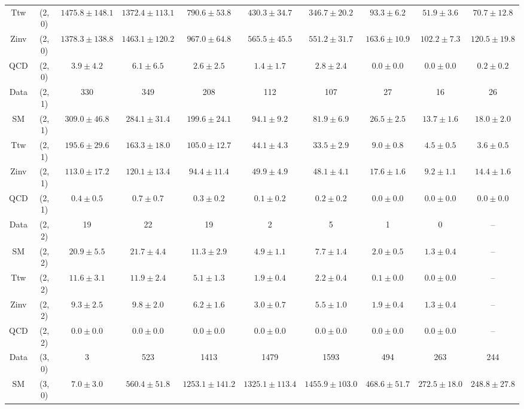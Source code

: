 \begin{table}[h!]
{\begin{tabular}{cccccccccc}
	Ttw & (2, 0) & $1475.8\pm 148.1$ & $1372.4\pm 113.1$ & $790.6\pm 53.8$ & $430.3\pm 34.7$ & $346.7\pm 20.2$ & $93.3\pm 6.2$ & $51.9\pm 3.6$ & $70.7\pm 12.8$ \\[0.5ex] 
	Zinv & (2, 0) & $1378.3\pm 138.8$ & $1463.1\pm 120.2$ & $967.0\pm 64.8$ & $565.5\pm 45.5$ & $551.2\pm 31.7$ & $163.6\pm 10.9$ & $102.2\pm 7.3$ & $120.5\pm 19.8$ \\[0.5ex] 
	QCD & (2, 0) & $3.9\pm 4.2$ & $6.1\pm 6.5$ & $2.6\pm 2.5$ & $1.4\pm 1.7$ & $2.8\pm 2.4$ & $0.0\pm 0.0$ & $0.0\pm 0.0$ & $0.2\pm 0.2$ \\[0.5ex] 
	Data & (2, 1) & 330 & 349 & 208 & 112 & 107 & 27 & 16 & 26 \\[0.5ex] 
	SM & (2, 1) & $309.0\pm 46.8$ & $284.1\pm 31.4$ & $199.6\pm 24.1$ & $94.1\pm 9.2$ & $81.9\pm 6.9$ & $26.5\pm 2.5$ & $13.7\pm 1.6$ & $18.0\pm 2.0$ \\[0.5ex] 
	Ttw & (2, 1) & $195.6\pm 29.6$ & $163.3\pm 18.0$ & $105.0\pm 12.7$ & $44.1\pm 4.3$ & $33.5\pm 2.9$ & $9.0\pm 0.8$ & $4.5\pm 0.5$ & $3.6\pm 0.5$ \\[0.5ex] 
	Zinv & (2, 1) & $113.0\pm 17.2$ & $120.1\pm 13.4$ & $94.4\pm 11.4$ & $49.9\pm 4.9$ & $48.1\pm 4.1$ & $17.6\pm 1.6$ & $9.2\pm 1.1$ & $14.4\pm 1.6$ \\[0.5ex] 
	QCD & (2, 1) & $0.4\pm 0.5$ & $0.7\pm 0.7$ & $0.3\pm 0.2$ & $0.1\pm 0.2$ & $0.2\pm 0.2$ & $0.0\pm 0.0$ & $0.0\pm 0.0$ & $0.0\pm 0.0$ \\[0.5ex] 
	Data & (2, 2) & 19 & 22 & 19 & 2 & 5 & 1 & 0 & -- \\[0.5ex] 
	SM & (2, 2) & $20.9\pm 5.5$ & $21.7\pm 4.4$ & $11.3\pm 2.9$ & $4.9\pm 1.1$ & $7.7\pm 1.4$ & $2.0\pm 0.5$ & $1.3\pm 0.4$ & -- \\[0.5ex] 
	Ttw & (2, 2) & $11.6\pm 3.1$ & $11.9\pm 2.4$ & $5.1\pm 1.3$ & $1.9\pm 0.4$ & $2.2\pm 0.4$ & $0.1\pm 0.0$ & $0.0\pm 0.0$ & -- \\[0.5ex] 
	Zinv & (2, 2) & $9.3\pm 2.5$ & $9.8\pm 2.0$ & $6.2\pm 1.6$ & $3.0\pm 0.7$ & $5.5\pm 1.0$ & $1.9\pm 0.4$ & $1.3\pm 0.4$ & -- \\[0.5ex] 
	QCD & (2, 2) & $0.0\pm 0.0$ & $0.0\pm 0.0$ & $0.0\pm 0.0$ & $0.0\pm 0.0$ & $0.0\pm 0.0$ & $0.0\pm 0.0$ & $0.0\pm 0.0$ & -- \\[0.5ex] 
	Data & (3, 0) & 3 & 523 & 1413 & 1479 & 1593 & 494 & 263 & 244 \\[0.5ex] 
	SM & (3, 0) & $7.0\pm 3.0$ & $560.4\pm 51.8$ & $1253.1\pm 141.2$ & $1325.1\pm 113.4$ & $1455.9\pm 103.0$ & $468.6\pm 51.7$ & $272.5\pm 18.0$ & $248.8\pm 27.8$ \\[0.5ex] 

\end{tabular}}
\end{table}
